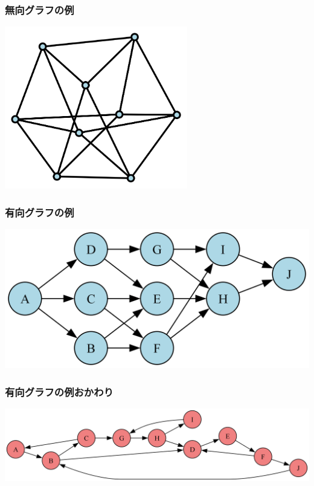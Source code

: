 \documentclass[aspectratio=169,dvipdfmx,12pt,notheorems]{beamer}
\theoremstyle{definition}
\begin{document}
\begin{frame}\frametitle{無向グラフの例}

\begin{center}
\includegraphics[width=8cm]{graph.png}
\end{center}

\end{frame}

\begin{frame}\frametitle{有向グラフの例}

\begin{center}
\includegraphics[width=15cm]{dag_example.png}
\end{center}

\end{frame}

\begin{frame}\frametitle{有向グラフの例おかわり}

\begin{center}
\includegraphics[width=15cm]{non_dag_example.png}
\end{center}

\end{frame}
\end{document}
